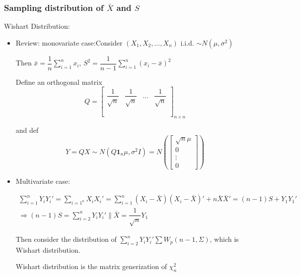         
\subsubsection{Sampling distribution of $ \bar{X} $ and $ S $}

Wishart Distribution:
\begin{itemize}[topsep=2pt,itemsep=2pt]
    \item Review: monovariate case:Consider $ (X_1,X_2,\ldots,X_n) $ i.i.d. $ \sim N(\mu,\sigma ^2) $

    Then $ \bar{x}=\dfrac{1}{n}\sum_{i=1}^nx_i $, $ S^2=\dfrac{1}{n-1}\sum_{i=1}^n(x_i-\bar{x})^2 $
    
    Define an orthogonal matrix
    \[
        Q=\begin{bmatrix}
            \dfrac{1}{\sqrt{n}}&\dfrac{1}{\sqrt{n}}&\ldots&\dfrac{1}{\sqrt{n}}\\
            &&&\\
            &&&\\
            &&&
        \end{bmatrix} _{n\times n}
    \]
    
    and def 
    \[
        Y=QX\sim N(Q\mathbf{1}_n\mu,\sigma^2I) =N(\begin{bmatrix}
            \sqrt{n}\mu\\0\\ \vdots\\0
        \end{bmatrix})
    \]




    \item Multivariate case: 
    





    \begin{align*}
        \sum_{i=1}^nY_iY_i'=\sum_{i=1^n}X_iX_i'=\sum_{i=1}^n(X_i-\bar{X})(X_i-\bar{X})'+n\bar{X}\bar{X}'=(n-1)S+Y_1Y_1' \\
        \Rightarrow (n-1)S=\sum_{i=2}^nY_iY_i'\parallel \bar{X}=\dfrac{1}{\sqrt{n}}Y_1
    \end{align*} 

    Then consider the distribution of $ {\displaystyle\sum_{i=2}^nY_iY_i'} \sum W_p(n-1,\Sigma )$, which is Wishart distribution.

    \begin{point}
        Wishart distribution is the matrix generization of $ \chi^2_n $
    \end{point}
    

\end{itemize}
